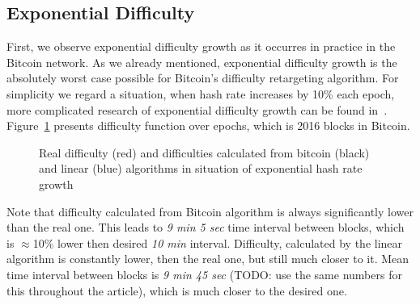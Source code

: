 \documentclass[]{llncs}
\begin{document}
\subsection{Exponential Difficulty}

First, we observe exponential difficulty growth as it occurres in practice in the Bitcoin network. As we already mentioned, exponential difficulty growth is the absolutely worst case possible for Bitcoin’s difficulty retargeting algorithm.
For simplicity we regard a situation, when hash rate increases by 10\% each epoch, more complicated research of exponential difficulty growth can be found in~\cite{kraft2015difficulty}.
Figure~\ref{fig:exp} presents difficulty function over epochs, which is 2016 blocks in Bitcoin.

\begin{figure}[h]
\caption{Real difficulty (red) and difficulties calculated from bitcoin (black) and linear (blue) algorithms in situation of exponential hash rate growth}
\label{fig:exp}
\end{figure}

Note that difficulty calculated from Bitcoin algorithm is always significantly lower than the real one.
This leads to \textit{9 min 5 sec} time interval between blocks, which is $\approx$10\% lower then desired \textit{10 min} interval.
Difficulty, calculated by the linear algorithm is constantly lower, then the real one, but still much closer to it.
Mean time interval between blocks is \textit{9 min 45 sec} (TODO: use the same numbers for this throughout the article), which is much closer to the desired one.
\end{document}
